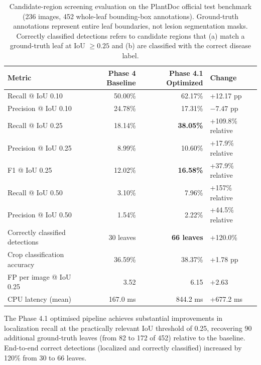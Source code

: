 \documentclass[pdflatex,sn-mathphys-num]{sn-jnl}
\begin{document}
\begin{table}[H]
\caption{Candidate-region screening evaluation on the PlantDoc official test benchmark
(236 images, 452 whole-leaf bounding-box annotations). Ground-truth annotations
represent entire leaf boundaries, not lesion segmentation masks. Correctly classified
detections refers to candidate regions that (a) match a ground-truth leaf at
IoU $\geq 0.25$ and (b) are classified with the correct disease label.}
\label{tab:screening_results}
\centering
\begin{tabular}{lrrl}
\toprule
\textbf{Metric} & \textbf{Phase 4 Baseline} & \textbf{Phase 4.1 Optimized} & \textbf{Change} \\
\midrule
Recall @ IoU 0.10        & 50.00\% & 62.17\% & +12.17 pp \\
Precision @ IoU 0.10     & 24.78\% & 17.31\% & $-7.47$ pp \\
Recall @ IoU 0.25        & 18.14\% & \textbf{38.05\%} & +109.8\% relative \\
Precision @ IoU 0.25     &  8.99\% & 10.60\% & +17.9\% relative \\
F1 @ IoU 0.25            & 12.02\% & \textbf{16.58\%} & +37.9\% relative \\
Recall @ IoU 0.50        &  3.10\% &  7.96\% & +157\% relative \\
Precision @ IoU 0.50     &  1.54\% &  2.22\% & +44.5\% relative \\
Correctly classified detections & 30 leaves & \textbf{66 leaves} & +120.0\% \\
Crop classification accuracy & 36.59\% & 38.37\% & +1.78 pp \\
FP per image @ IoU 0.25  &  3.52 &  6.15 & $+2.63$ \\
CPU latency (mean)        & 167.0 ms & 844.2 ms & +677.2 ms \\
\bottomrule
\end{tabular}
\end{table}

The Phase 4.1 optimised pipeline achieves substantial improvements in localization
recall at the practically relevant IoU threshold of 0.25, recovering 90 additional
ground-truth leaves (from 82 to 172 of 452) relative to the baseline. End-to-end
correct detections (localized and correctly classified) increased by 120\% from 30 to
66 leaves.
\end{document}
